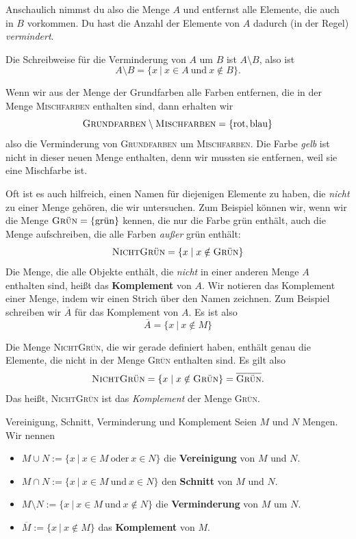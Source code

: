 \documentclass[../../main.tex]{subfiles}
\begin{document}
Anschaulich nimmst du also die Menge $A$ und entfernst alle Elemente, die auch in $B$ vorkommen. Du hast die Anzahl der Elemente von $A$ dadurch (in der Regel) \emph{vermindert}.

Die Schreibweise für die Verminderung von $A$ um $B$ ist $A\setminus B$, also ist
\[A\setminus B=\{x~|~x\in A~\text{und}~x\notin B\}.\]

\begin{example}{}
    Wenn wir aus der Menge der Grundfarben alle Farben entfernen, die in der Menge \textsc{Mischfarben} enthalten sind, dann erhalten wir
    \[\textsc{Grundfarben}\setminus\textsc{Mischfarben}=\{\text{rot},\text{blau}\}\]
    also die Verminderung von \textsc{Grundfarben} um \textsc{Mischfarben}. Die Farbe \emph{gelb} ist nicht in dieser neuen Menge enthalten, denn wir mussten sie entfernen, weil sie eine Mischfarbe ist.
\end{example}

Oft ist es auch hilfreich, einen Namen für diejenigen Elemente zu haben, die \emph{nicht} zu einer Menge gehören, die wir untersuchen. Zum Beispiel können wir, wenn wir die Menge $\textsc{Grün}=\{\text{grün}\}$ kennen, die nur die Farbe grün enthält, auch die Menge aufschreiben, die alle Farben \emph{außer} grün enthält:
\[\textsc{NichtGrün}=\{x\mid x\notin\textsc{Grün}\}\]
Die Menge, die alle Objekte enthält, die \emph{nicht} in einer anderen Menge $A$ enthalten sind, heißt das \textbf{Komplement} von $A$. Wir notieren das Komplement einer Menge, indem wir einen Strich über den Namen zeichnen. Zum Beispiel schreiben wir $\overline{A}$ für das Komplement von $A$. Es ist also
\[\overline{A}=\{x~|~x\notin M\}\]

\begin{example}{}
    Die Menge \textsc{NichtGrün}, die wir gerade definiert haben, enthält genau die Elemente, die nicht in der Menge \textsc{Grün} enthalten sind. Es gilt also
    \[\textsc{NichtGrün}=\{x\mid x\notin\textsc{Grün}\}=\overline{\textsc{Grün}}.\]
    Das heißt, \textsc{NichtGrün} ist das \emph{Komplement} der Menge \textsc{Grün}.
\end{example}

\begin{definition}{Vereinigung, Schnitt, Verminderung und Komplement}
    Seien $M$ und $N$ Mengen. Wir nennen
    \begin{itemize}
        \item $M\cup N:=\{x~|~x\in M~\text{oder}~x\in N\}$ die \textbf{Vereinigung} von $M$ und $N$.
        \item $M\cap N:=\{x~|~x\in M~\text{und}~x\in N\}$ den \textbf{Schnitt} von $M$ und $N$.
        \item $M\setminus N:=\{x~|~x\in M~\text{und}~x\notin N\}$ die \textbf{Verminderung} von $M$ um $N$.
        \item $\overline{M}:=\{x~|~x\notin M\}$ das \textbf{Komplement} von $M$.
    \end{itemize}
\end{definition}
\end{document}
